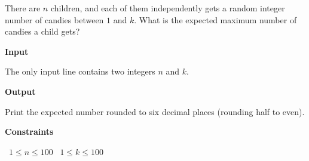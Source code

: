 There are $n$ children, and each of them independently gets a random integer number of candies between $1$ and $k$.
What is the expected maximum number of candies a child gets?

\vspace{0.3cm}\noindent\textbf{Input}

The only input line contains two integers $n$ and $k$.

\vspace{0.3cm}\noindent\textbf{Output}

Print the expected number rounded to six decimal places (rounding half to even).

\vspace{0.3cm}\noindent\textbf{Constraints}

\textbullet\ $1 \le n \le 100$
\textbullet\ $1 \le k \le 100$